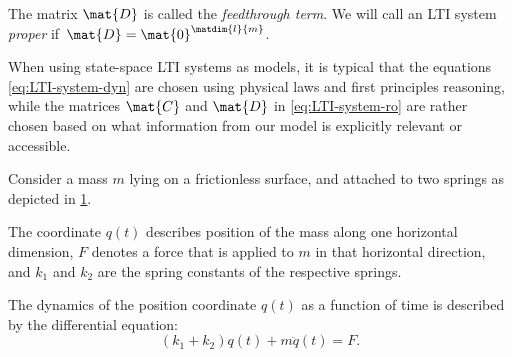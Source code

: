The matrix $\mat{D}$ is called the \emph{feedthrough term}.
We will call an LTI system \emph{proper} if~$\mat{D}=\mat{0}^{\matdim{l}{m}}$.

\begin{remark}
    When using state-space LTI systems as models, it is typical that the equations \cref{eq:LTI-system-dyn} are chosen using physical laws and first principles reasoning, while the matrices $\mat{C}$ and $\mat{D}$ in \cref{eq:LTI-system-ro} are rather chosen based on what information from our model is explicitly relevant or accessible.
\end{remark}

\begin{example}
    Consider a mass $m$ lying on a frictionless surface, and attached to two springs as depicted in  \cref{fig:LTI-example_two-springs-one-mass}.

    \begin{figure}[h]\label{fig:LTI-example_two-springs-one-mass}
        \centering
    \end{figure}

    The coordinate $q(t)$ describes position of the mass along one horizontal dimension, $F$ denotes a force that is applied to $m$ in that horizontal direction, and $k_1$ and $k_2$ are the spring constants of the respective springs.

    The dynamics of the position coordinate $q(t)$ as a function of time is described by the differential equation:
    \begin{equation}
        (k_1 + k_2)q(t) + m \ddot{q}(t) = F.
    \end{equation}


\end{example}
